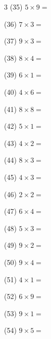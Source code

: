 \documentclass[a4paper, 11pt]{ltjsarticle}
\begin{document}
\begin{multicols*}{3}
\noindent (35) \quad $5 \times 9 =$
\vspace*{\fill}

\noindent (36) \quad $7 \times 3 =$
\vspace*{\fill}
\columnbreak

\noindent (37) \quad $9 \times 3 =$
\vspace*{\fill}

\noindent (38) \quad $8 \times 4 =$
\vspace*{\fill}

\noindent (39) \quad $6 \times 1 =$
\vspace*{\fill}

\noindent (40) \quad $4 \times 6 =$
\vspace*{\fill}

\noindent (41) \quad $8 \times 8 =$
\vspace*{\fill}

\noindent (42) \quad $5 \times 1 =$
\vspace*{\fill}

\noindent (43) \quad $4 \times 2 =$
\vspace*{\fill}

\noindent (44) \quad $8 \times 3 =$
\vspace*{\fill}

\noindent (45) \quad $4 \times 3 =$
\vspace*{\fill}

\noindent (46) \quad $2 \times 2 =$
\vspace*{\fill}

\noindent (47) \quad $6 \times 4 =$
\vspace*{\fill}

\noindent (48) \quad $5 \times 3 =$
\vspace*{\fill}
\columnbreak

\noindent (49) \quad $9 \times 2 =$
\vspace*{\fill}

\noindent (50) \quad $9 \times 4 =$
\vspace*{\fill}

\noindent (51) \quad $4 \times 1 =$
\vspace*{\fill}

\noindent (52) \quad $6 \times 9 =$
\vspace*{\fill}

\noindent (53) \quad $9 \times 1 =$
\vspace*{\fill}

\noindent (54) \quad $9 \times 5 =$
\vspace*{\fill}


\end{multicols*}
\end{document}
